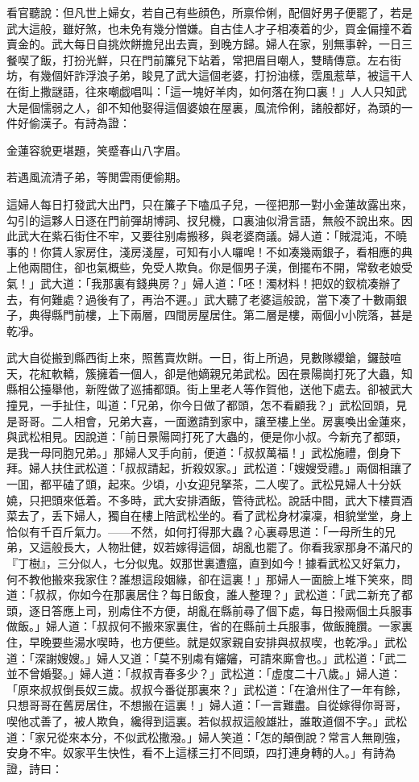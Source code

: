 看官聽說：但凡世上婦女，若自己有些顔色，所禀伶俐，配個好男子便罷了，若是武大這般，雖好煞，也未免有幾分憎嫌。自古佳人才子相凑着的少，買金偏撞不着賣金的。武大每日自挑炊餅擔兒出去賣，到晚方歸。婦人在家，别無事幹，一日三餐喫了飯，打扮光鮮，只在門前簾兒下站着，常把眉目嘲人，雙睛傳意。左右街坊，有幾個奸詐浮浪子弟，睃見了武大這個老婆，打扮油樣，霑風惹草，被這干人在街上撒謎語，往來嘲戯唱叫：「這一塊好羊肉，如何落在狗口裏！」人人只知武大是個懦弱之人，卻不知他娶得這個婆娘在屋裏，風流伶俐，諸般都好，為頭的一件好偷漢子。有詩為證：

\begin{myquote}
金蓮容貌更堪題，笑蹙春山八字眉。

若遇風流清子弟，等閒雲雨便偷期。
\end{myquote}

這婦人每日打發武大出門，只在簾子下嗑瓜子兒，一徑把那一對小金蓮故露出來，勾引的這夥人日逐在門前彈胡博詞、扠兒機，口裏油似滑言語，無般不說出來。因此武大在紫石街住不牢，又要往别䖏搬移，與老婆商議。婦人道：「賊混沌，不曉事的！你賃人家房住，淺房淺屋，可知有小人囉唣！不如凑幾兩銀子，看相應的典上他兩間住，卻也氣概些，免受人欺負。你是個男子漢，倒擺布不開，常敎老娘受氣！」武大道：「我那裏有錢典房？」婦人道：「呸！濁材料！把奴的釵梳凑辦了去，有何難處？過後有了，再治不遲。」武大聽了老婆這般說，當下凑了十數兩銀子，典得縣門前樓，上下兩層，四間房屋居住。第二層是樓，兩個小小院落，甚是乾凈。

武大自從搬到縣西街上來，照舊賣炊餅。一日，街上所過，見數隊纓鎗，鑼鼓喧天，花紅軟轎，簇擁着一個人，卻是他嫡親兄弟武松。因在景陽崗打死了大蟲，知縣相公擡舉他，新陞做了巡捕都頭。街上里老人等作賀他，送他下處去。卻被武大撞見，一手扯住，叫道：「兄弟，你今日做了都頭，怎不看顧我？」武松回頭，見是哥哥。二人相會，兄弟大喜，一面邀請到家中，讓至樓上坐。房裏喚出金蓮來，與武松相見。因說道：「前日景陽岡打死了大蟲的，便是你小叔。今新充了都頭，是我一母同胞兄弟。」那婦人叉手向前，便道：「叔叔萬福！」武松施禮，倒身下拜。婦人扶住武松道：「叔叔請起，折殺奴家。」武松道：「嫂嫂受禮。」兩個相讓了一囬，都平磕了頭，起來。少頃，小女迎兒拏茶，二人喫了。武松見婦人十分妖嬈，只把頭來低着。不多時，武大安排酒飯，管待武松。說話中間，武大下樓買酒菜去了，丢下婦人，獨自在樓上陪武松坐的。看了武松身材凜凜，相貌堂堂，身上恰似有千百斤氣力。——不然，如何打得那大蟲？心裏尋思道：「一母所生的兄弟，又這般長大，人物壯健，奴若嫁得這個，胡亂也罷了。你看我家那身不滿尺的『丁樹』，三分似人，七分似鬼。奴那世裏遭瘟，直到如今！據看武松又好氣力，何不教他搬來我家住？誰想這段姻緣，卻在這裏！」那婦人一面臉上堆下笑來，問道：「叔叔，你如今在那裏居住？每日飯食，誰人整理？」武松道：「武二新充了都頭，逐日答應上司，别䖏住不方便，胡亂在縣前尋了個下處，每日撥兩個土兵服事做飯。」婦人道：「叔叔何不搬來家裏住，省的在縣前土兵服事，做飯腌臢。一家裏住，早晚要些湯水喫時，也方便些。就是奴家親自安排與叔叔喫，也乾凈。」武松道：「深謝嫂嫂。」婦人又道：「莫不别䖏有嬸嬸，可請來廝會也。」武松道：「武二並不曾婚娶。」婦人道：「叔叔青春多少？」武松道：「虚度二十八歲。」婦人道：「原來叔叔倒長奴三歲。叔叔今番従那裏來？」武松道：「在滄州住了一年有餘，只想哥哥在舊房居住，不想搬在這裏！」婦人道：「一言難盡。自從嫁得你哥哥，喫他忒善了，被人欺負，纔得到這裏。若似叔叔這般雄壯，誰敢道個不字。」武松道：「家兄從來本分，不似武松撒潑。」婦人笑道：「怎的顛倒說？常言人無剛強，安身不牢。奴家平生快性，看不上這樣三打不囘頭，四打連身轉的人。」有詩為證，詩曰：


